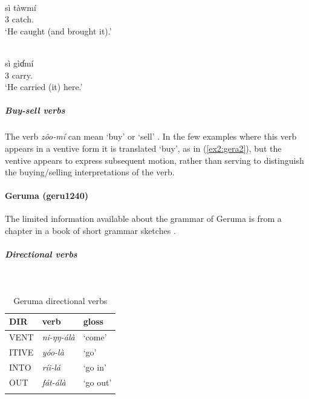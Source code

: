 \ea\label{ex2:gera4}
 \\
\gll sì	tàwmí \\
3	catch. \\
\glt `He caught (and brought it).'

\ex\label{ex2:gera5}
 \\
\gll  sì	gìɗmí \\
3	carry. \\
\glt `He carried (it) here.'
\z 

\subparagraph{Buy-sell verbs}



The verb \textit{zôo-mí} can mean `buy' or `sell' \citep[121]{schuhBoleTangaleLanguagesBauchi1978}. In the few examples where this verb appears in a ventive form it is translated `buy', as in (\ref{ex2:gera2}), but the ventive appears to express subsequent motion, rather than serving to distinguish the buying/selling interpretations of the verb.

\paragraph*{Geruma (geru1240)} 

The limited information available about the grammar of Geruma is from a chapter in a book of short grammar sketches \citep{schuhBoleTangaleLanguagesBauchi1978}. 

\subparagraph{Directional verbs}~



\begin{table}[H]
	\caption{Geruma directional verbs} 
	\label{tab:geruV}
	\begin{tabular}{lll} %
		\lsptoprule
		DIR & verb & gloss   \\ %
		\midrule
		VENT & \textit{ni-ŋŋ-álà} & `come' \\
		ITIVE & \textit{yóo-là} & `go' \\
		INTO& \textit{ríi-lá} & `go in' \\
		OUT & \textit{fát-álà} & `go out' \\
		\lspbottomrule
	\end{tabular}
\end{table}

